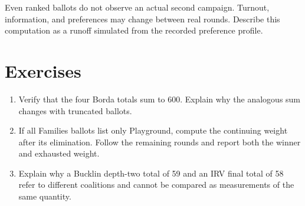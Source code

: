 Even ranked ballots do not observe an actual second campaign. Turnout, information, and preferences may change between real rounds. Describe this computation as a runoff simulated from the recorded preference profile.

\section{Exercises}
\begin{enumerate}
\item Verify that the four Borda totals sum to 600. Explain why the analogous sum changes with truncated ballots.
\item If all Families ballots list only Playground, compute the continuing weight after its elimination. Follow the remaining rounds and report both the winner and exhausted weight.
\item Explain why a Bucklin depth-two total of 59 and an IRV final total of 58 refer to different coalitions and cannot be compared as measurements of the same quantity.
\end{enumerate}
